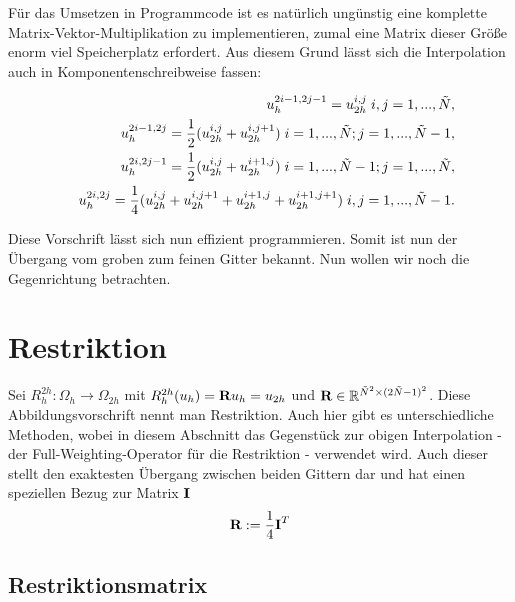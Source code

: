 Für das Umsetzen in Programmcode ist es natürlich ungünstig eine komplette Matrix-Vektor-Multiplikation zu implementieren, zumal eine Matrix dieser Größe enorm viel Speicherplatz erfordert. Aus diesem Grund lässt sich die Interpolation auch in Komponentenschreibweise fassen:

\begin{eqnarray}
&&u_{h}^{2i-1,2j-1} = u_{2h}^{i,j} \hspace{0.1cm} i,j = 1,...,\tilde N, \\
&&u_{h}^{2i-1,2j} = \frac{1}{2} (u_{2h}^{i,j} + u_{2h}^{i,j+1}) \hspace{0.1cm} i = 1,...,\tilde N; j = 1,...,\tilde N - 1, \\
&&u_{h}^{2i,2j-1} = \frac{1}{2} (u_{2h}^{i,j} + u_{2h}^{i+1,j}) \hspace{0.1cm} i = 1,...,\tilde N - 1; j = 1,...,\tilde N, \\
&&u_{h}^{2i,2j} = \frac{1}{4} (u_{2h}^{i,j} + u_{2h}^{i,j+1} + u_{2h}^{i+1,j} + u_{2h}^{i+1,j+1}) \hspace{0.1cm} i,j = 1,...,\tilde N - 1.
\end{eqnarray}

Diese Vorschrift lässt sich nun effizient programmieren. Somit ist nun der Übergang vom groben zum feinen Gitter bekannt. Nun wollen wir noch die Gegenrichtung betrachten.

\section{Restriktion}

Sei $R_{h}^{2h}: \Omega_{h} \longrightarrow \Omega_{2h}$ mit $R_{h}^{2h}(u_{h}) = {\textbf{R}}u_{h} = u_{2h}$ und ${\textbf{R}} \in \mathbb{R}^{\tilde N^{2} \times (2 \tilde N - 1)^{2}}$. Diese Abbildungsvorschrift nennt man Restriktion. Auch hier gibt es unterschiedliche Methoden, wobei in diesem Abschnitt das Gegenstück zur obigen Interpolation - der Full-Weighting-Operator für die Restriktion - verwendet wird. Auch dieser stellt den exaktesten Übergang zwischen beiden Gittern dar und hat einen speziellen Bezug zur Matrix ${\textbf{I}}$
\begin{equation}
{\textbf{R}} := \frac {1} {4} {\textbf{I}}^{T}
\end{equation}

\subsection{Restriktionsmatrix}

